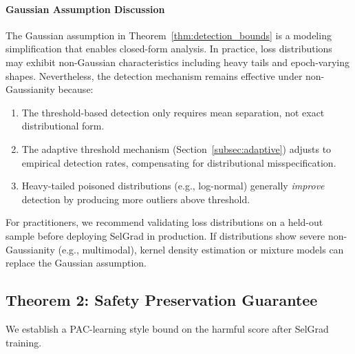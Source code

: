 \paragraph{Gaussian Assumption Discussion}
The Gaussian assumption in Theorem~\ref{thm:detection_bounds} is a modeling simplification that enables closed-form analysis. In practice, loss distributions may exhibit non-Gaussian characteristics including heavy tails and epoch-varying shapes. Nevertheless, the detection mechanism remains effective under non-Gaussianity because:
\begin{enumerate}
    \item The threshold-based detection only requires mean separation, not exact distributional form.
    \item The adaptive threshold mechanism (Section~\ref{subsec:adaptive}) adjusts to empirical detection rates, compensating for distributional misspecification.
    \item Heavy-tailed poisoned distributions (e.g., log-normal) generally \textit{improve} detection by producing more outliers above threshold.
\end{enumerate}

For practitioners, we recommend validating loss distributions on a held-out sample before deploying SelGrad in production. If distributions show severe non-Gaussianity (e.g., multimodal), kernel density estimation or mixture models can replace the Gaussian assumption.

\subsection{Theorem 2: Safety Preservation Guarantee}
\label{subsec:theorem2}

We establish a PAC-learning style bound on the harmful score after SelGrad training.

